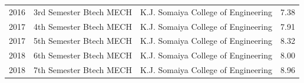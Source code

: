 \documentclass[letterpaper,11pt]{article}
\begin{document}
\begin{table}[h!]
\begin{center}
\begin{tabular}{|l|c|r|l|}
			\hspace{0.2cm}2016 & \hspace{0.2cm} 3rd Semester Btech MECH \hspace{0.2cm} &\hspace{0.2cm}K.J. Somaiya College of Engineering\hspace{0.2cm} & \hspace{1.2cm} 7.38 \hspace{0.2cm}\\
			\hspace{0.2cm}2017 & \hspace{0.2cm} 4th Semester Btech MECH \hspace{0.2cm} &\hspace{0.2cm}K.J. Somaiya College of Engineering\hspace{0.2cm} & \hspace{1.2cm} 7.91 \hspace{0.2cm}\\
			\hspace{0.2cm}2017 & \hspace{0.2cm} 5th Semester Btech MECH \hspace{0.2cm} &\hspace{0.2cm}K.J. Somaiya College of Engineering\hspace{0.2cm} & \hspace{1.2cm} 8.32 \hspace{0.2cm}\\
			\hspace{0.2cm}2018 & \hspace{0.2cm} 6th Semester Btech MECH \hspace{0.2cm} &\hspace{0.2cm}K.J. Somaiya College of Engineering\hspace{0.2cm} & \hspace{1.2cm} 8.00 \hspace{0.2cm}\\
			\hspace{0.2cm}2018 & \hspace{0.2cm} 7th Semester Btech MECH \hspace{0.2cm} &\hspace{0.2cm}K.J. Somaiya College of Engineering\hspace{0.2cm} & \hspace{1.2cm} 8.96 \hspace{0.2cm}\\
			\hline
		\end{tabular}
	\end{center}
\end{table}
\end{document}
